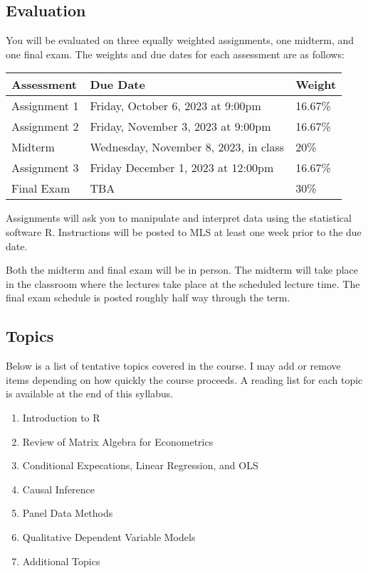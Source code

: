 \documentclass[
  letterpaper,
  DIV=11,
  numbers=noendperiod]{scrartcl}
\begin{document}
\hypertarget{evaluation}{%
\subsection{Evaluation}\label{evaluation}}

You will be evaluated on three equally weighted assignments, one
midterm, and one final exam. The weights and due dates for each
assessment are as follows:

\begin{longtable}[]{@{}lll@{}}
\toprule\noalign{}
Assessment & Due Date & Weight \\
\midrule\noalign{}
\endhead
\bottomrule\noalign{}
\endlastfoot
Assignment 1 & Friday, October 6, 2023 at 9:00pm & 16.67\% \\
Assignment 2 & Friday, November 3, 2023 at 9:00pm & 16.67\% \\
Midterm & Wednesday, November 8, 2023, in class & 20\% \\
Assignment 3 & Friday December 1, 2023 at 12:00pm & 16.67\% \\
Final Exam & TBA & 30\% \\
\end{longtable}

Assignments will ask you to manipulate and interpret data using the
statistical software R. Instructions will be posted to MLS at least one
week prior to the due date.

Both the midterm and final exam will be in person. The midterm will take
place in the classroom where the lectures take place at the scheduled
lecture time. The final exam schedule is posted roughly half way through
the term.

\hypertarget{topics}{%
\subsection{Topics}\label{topics}}

Below is a list of tentative topics covered in the course. I may add or
remove items depending on how quickly the course proceeds. A reading
list for each topic is available at the end of this syllabus.

\begin{enumerate}
\def\labelenumi{\arabic{enumi}.}
\item
  Introduction to R
\item
  Review of Matrix Algebra for Econometrics
\item
  Conditional Expecations, Linear Regression, and OLS
\item
  Causal Inference
\item
  Panel Data Methods
\item
  Qualitative Dependent Variable Models
\item
  Additional Topics
\end{enumerate}
\end{document}
